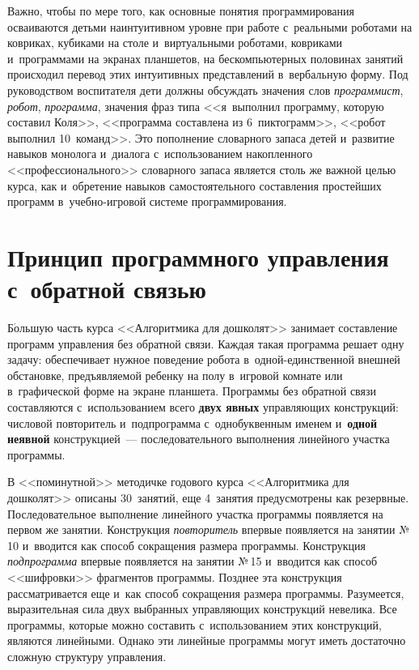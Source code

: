 \begin{multicols}{2}
  Важно, чтобы по мере того, как основные по\-нятия программирования 
осваиваются детьми на\linebreak интуитивном уровне при работе с~реальными роботами 
на ковриках, кубиками на столе и~виртуальными роботами, ковриками 
и~программами на экранах планшетов, на бескомпьютерных половинах занятий 
происходил перевод этих интуитивных представлений в~вербальную форму. 
Под руководством воспитателя дети должны обсуждать значения слов 
\textit{программист}, \textit{робот}, \textit{программа}, значения фраз типа 
<<я~выполнил программу, которую составил Коля>>, <<программа составлена 
из 6~пиктограмм>>, <<робот выполнил 10~команд>>. Это пополнение 
словарного запаса детей и~развитие навыков монолога и~диалога 
с~использованием накопленного <<профессионального>> словарного запаса 
является столь же важной целью курса, как и~обретение навыков 
самостоятельного составления простейших программ в~учеб\-но-иг\-ро\-вой 
системе программирования.
  
\section{Принцип программного управления с~обратной связью}

  Б$\acute{\mbox{о}}$льшую часть курса <<Алгоритмика для дошколят>> 
занимает составление программ управления без обратной связи. Каждая такая 
программа решает одну задачу: обеспечивает нужное поведение робота  
в~од\-ной-един\-ст\-вен\-ной внешней обстановке, предъявляемой ребенку на 
полу в~игровой комнате или в~графической форме на экране планшета. 
Программы без обратной связи составляются с~использованием всего 
\textbf{двух явных} управляющих конструкций: числовой повторитель 
и~подпрограмма с~однобуквенным именем и~\textbf{одной неявной} 
конструкцией~--- последовательного выполнения линейного участка 
программы.
  
  В <<поминутной>> методичке годового курса <<Алгоритмика для 
дошколят>> описаны 30~занятий, еще 4~занятия предусмотрены как 
резервные. Последовательное выполнение линейного участка программы 
появляется на первом же занятии. Конструкция \textit{повторитель} впервые 
появляется на занятии №\,10 и~вводится как способ сокращения размера 
программы. Конструкция \textit{подпрограмма} впервые появляется на занятии 
№\,15 и~вводится как способ <<шифровки>> фрагментов программы. Позднее 
эта конструкция рассматривается еще и~как способ сокращения размера 
программы. Разумеется, выразительная сила двух выбранных управляющих 
конструкций невелика. Все программы, которые можно составить 
с~использованием этих конструкций, являются линейными. Однако эти 
линейные программы могут иметь достаточно сложную структуру управления. 
  

\end{multicols}
